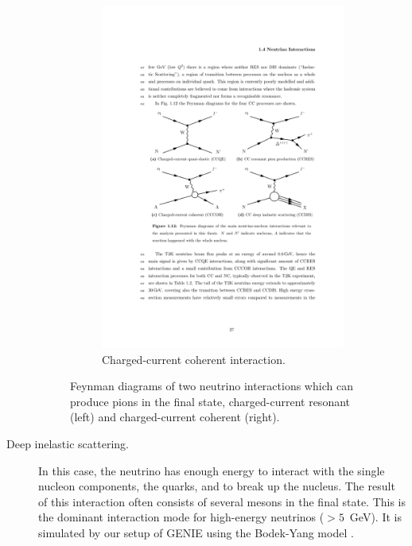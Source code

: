 \begin{description}
\begin{figure}[htbp]
\begin{subfigure}{0.48\textwidth}
\begin{center}
    \includegraphics[width=\linewidth]{figures/ccoh_feyn.pdf}
    \caption{Charged-current coherent interaction.}
    \label{fig:ccoh_feyn}
    \end{center}
  \end{subfigure}
  \caption{Feynman diagrams of two neutrino interactions which can produce pions in the final state, charged-current resonant (left) and charged-current coherent (right).}
\end{figure}

\item[Deep inelastic scattering.] In this case, the neutrino has enough energy to interact with the single nucleon components, the quarks, and to break up the nucleus. The result of this interaction often consists of several mesons in the final state. This is the dominant interaction mode for high-energy neutrinos ($>5$~GeV). It is simulated by our setup of GENIE using the Bodek-Yang model \cite{Yang:1998zb}.


\end{description}
